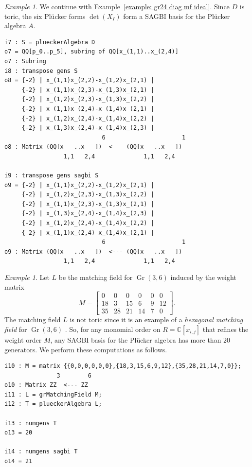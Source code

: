 \documentclass[11pt]{article}
\newcommand{\CC}{\mathbb C}
\DeclareMathOperator{\Gr}{Gr}
\theoremstyle{plain}
\theoremstyle{definition}
\theoremstyle{remark}
\newtheorem{example}[theorem]{Example}
\begin{document}
\begin{example} \label{example: gr24 subring}
    We continue with Example~\ref{example: gr24 diag mf ideal}. 
    Since $D$ is toric, the six Pl\"ucker forms $\det(X_I)$ form a SAGBI basis for the Pl\"ucker algebra $A$.

\begin{lstlisting}[caption = {Initial algebra of the Pl\"ucker algebra}]
i7 : S = plueckerAlgebra D
o7 = QQ[p_0..p_5], subring of QQ[x_(1,1)..x_(2,4)]
o7 : Subring
i8 : transpose gens S
o8 = {-2} | x_(1,1)x_(2,2)-x_(1,2)x_(2,1) |
     {-2} | x_(1,1)x_(2,3)-x_(1,3)x_(2,1) |
     {-2} | x_(1,2)x_(2,3)-x_(1,3)x_(2,2) |
     {-2} | x_(1,1)x_(2,4)-x_(1,4)x_(2,1) |
     {-2} | x_(1,2)x_(2,4)-x_(1,4)x_(2,2) |
     {-2} | x_(1,3)x_(2,4)-x_(1,4)x_(2,3) |
                            6                      1
o8 : Matrix (QQ[x   ..x   ])  <--- (QQ[x   ..x   ])
                 1,1   2,4              1,1   2,4

i9 : transpose gens sagbi S
o9 = {-2} | x_(1,1)x_(2,2)-x_(1,2)x_(2,1) |
     {-2} | x_(1,2)x_(2,3)-x_(1,3)x_(2,2) |
     {-2} | x_(1,1)x_(2,3)-x_(1,3)x_(2,1) |
     {-2} | x_(1,3)x_(2,4)-x_(1,4)x_(2,3) |
     {-2} | x_(1,2)x_(2,4)-x_(1,4)x_(2,2) |
     {-2} | x_(1,1)x_(2,4)-x_(1,4)x_(2,1) |
                            6                      1
o9 : Matrix (QQ[x   ..x   ])  <--- (QQ[x   ..x   ])
                 1,1   2,4              1,1   2,4
\end{lstlisting}

\end{example}


\begin{example}\label{example: gr36 hexagonal subring}
    Let $L$ be the matching field for $\Gr(3,6)$ induced by the weight matrix
    \[
    M = \begin{bmatrix}
        0 & 0 & 0 & 0 & 0 & 0 \\
        18 & 3 & 15 & 6 & 9 & 12 \\
        35 & 28 & 21 & 14 & 7 & 0 
    \end{bmatrix}.
    \]
    The matching field $L$ is not toric since it is an example of a \textit{hexagonal matching field} for $\Gr(3,6)$ \cite{mohammadi2019matching}. So, for any monomial order on $R = \CC[x_{i,j}]$ that refines the weight order $M$, any SAGBI basis for the Pl\"ucker algebra has more than $20$ generators. We perform these computations as follows.

\begin{lstlisting}[caption = {Initial algebra for a hexagonal matching field}]
i10 : M = matrix {{0,0,0,0,0,0},{18,3,15,6,9,12},{35,28,21,14,7,0}};
               3        6
o10 : Matrix ZZ  <--- ZZ
i11 : L = grMatchingField M;
i12 : T = plueckerAlgebra L;

i13 : numgens T
o13 = 20

i14 : numgens sagbi T
o14 = 21
\end{lstlisting}

\end{example}
\end{document}
